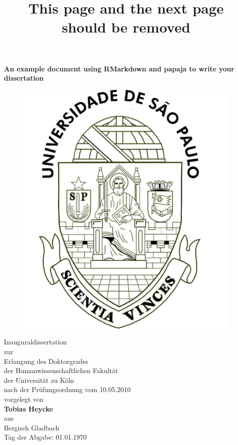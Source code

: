 \documentclass[
  ,doc,11pt, twoside,floatsintext]{apa6}
\title{This page and the next page should be removed}
\author{\textsuperscript{}}
\date{}
\affiliation{\vspace{0.5cm}\textsuperscript{} }
\begin{document}
\maketitle

\clearpage

\mbox{}\thispagestyle{empty}\clearpage

\setcounter{page}{1}

\thispagestyle{empty}
\begin{center}
\vspace*{10mm}
\textbf{\Large An example document using RMarkdown and papaja to write your dissertation}\\

\begin{figure}[h]
\begin{center}
\includegraphics[width=!,totalheight=!,scale=0.18]{usp-brazao.jpg}
\end{center}
\end{figure}
{ 
Inauguraldissertation\\
zur\\ 
Erlangung des Doktorgrades\\
der Humanwissenschaftlichen Fakultät\\
der Universität zu Köln  \\
nach der Prüfungsordnung vom 10.05.2010  \\
vorgelegt von  \\ 
\smallskip
\textbf{Tobias Heycke}\\
\smallskip
aus  \\
Bergisch Gladbach  \\
\smallskip
Tag der Abgabe: 01.01.1970\\
}
\end{center}
\end{document}
